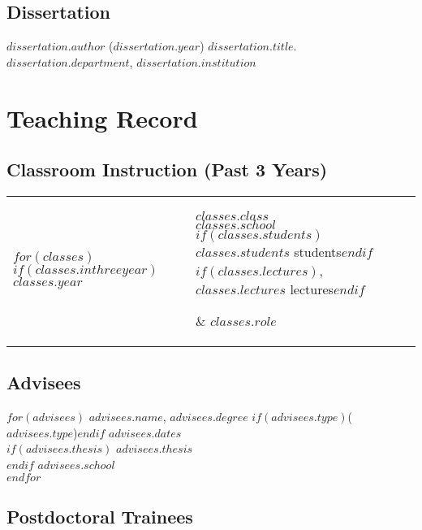 \documentclass[martgin, line]{article}
\begin{document}
\subsection*{Dissertation}
\textbf{$dissertation.author$} ($dissertation.year$) $dissertation.title$.
$dissertation.department$, $dissertation.institution$



\section*{Teaching Record}

\subsection*{Classroom Instruction (Past 3 Years)}

\setlength{\extrarowheight}{.75em}
\begin{longtable}[l]{lp{4in}l}
  $for(classes)$
    $if(classes.inthreeyear)$
      $classes.year$&
      \parbox[t]{4in} { $classes.class$\\
      \scriptsize{%
        \textit{$classes.school$}\\
        $if(classes.students)$$classes.students$ students$endif$%
        $if(classes.lectures)$, $classes.lectures$ lectures$endif$%
      }} & $classes.role$\\
    $endif$
  $endfor$
\end{longtable}
\setlength{\extrarowheight}{0em}


\subsection*{Advisees}


$for(advisees)$
$advisees.name$, $advisees.degree$ $if(advisees.type)$($advisees.type$)$endif$
\hfill $advisees.dates$\\ 
$if(advisees.thesis)$
\textit{$advisees.thesis$}\\
$endif$
$advisees.school$\\

$endfor$





\subsection*{Postdoctoral Trainees}
\end{document}
